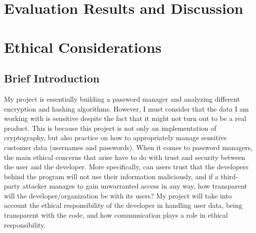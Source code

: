 \documentclass[10pt,twocolumn]{article}
\begin{document}
\section{Evaluation Results and Discussion}


\section{Ethical Considerations}
\subsection{Brief Introduction}
My project is essentially building a password manager and analyzing different encryption and hashing algorithms. However, I must consider that the data I am working with is sensitive despite the fact that it might not turn out to be a real product. This is because this project is not only an implementation of cryptography, but also practice on how to appropriately manage sensitive customer data (usernames and passwords). When it comes to password managers, the main ethical concerns that arise have to do with trust and security between the user and the developer. More specifically, can users trust that the developers behind the program will not use their information maliciously, and if a third-party attacker manages to gain unwarranted access in any way, how transparent will the developer/organization be with its users? My project will take into account the ethical responsibility of the developer in handling user data, being transparent with the code, and how communication plays a role in ethical responsibility.
\end{document}
